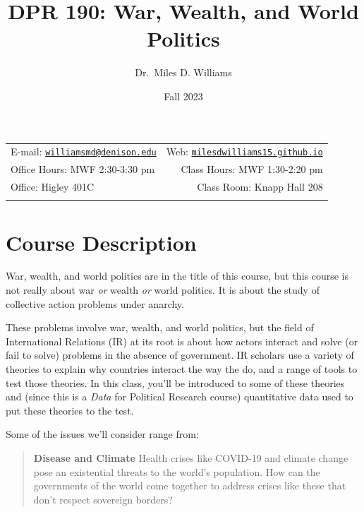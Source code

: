 \documentclass[11pt,]{article}
\title{DPR 190: War, Wealth, and World Politics}
\author{Dr.~Miles D. Williams}
\date{Fall 2023}
\begin{document}
		\maketitle
	

		\thispagestyle{firststyle}



	\noindent \begin{tabular*}{\textwidth}{ @{\extracolsep{\fill}} lr @{\extracolsep{\fill}}}


E-mail: \texttt{\href{mailto:williamsmd@denison.edu}{\nolinkurl{williamsmd@denison.edu}}} & Web: \href{http://milesdwilliams15.github.io}{\tt milesdwilliams15.github.io}\\
Office Hours: MWF 2:30-3:30 pm  &  Class Hours: MWF 1:30-2:20 pm\\
Office: Higley 401C  & Class Room: Knapp Hall 208\\
	&  \\
	\hline
	\end{tabular*}

\vspace{2mm}



\hypertarget{course-description}{%
\section{Course Description}\label{course-description}}

War, wealth, and world politics are in the title of this course, but
this course is not really about war \emph{or} wealth \emph{or} world
politics. It is about the study of collective action problems under
anarchy.

These problems involve war, wealth, and world politics, but the field of
International Relations (IR) at its root is about how actors interact
and solve (or fail to solve) problems in the absence of government. IR
scholars use a variety of theories to explain why countries interact the
way the do, and a range of tools to test those theories. In this class,
you'll be introduced to some of these theories and (since this is a
\emph{Data} for Political Research course) quantitative data used to put
these theories to the test.

Some of the issues we'll consider range from:

\begin{quote}
\textbf{Disease and Climate} \space \space Health crises like COVID-19
and climate change pose an existential threats to the world's
population. How can the governments of the world come together to
address crises like these that don't respect sovereign borders?
\end{quote}
\end{document}
